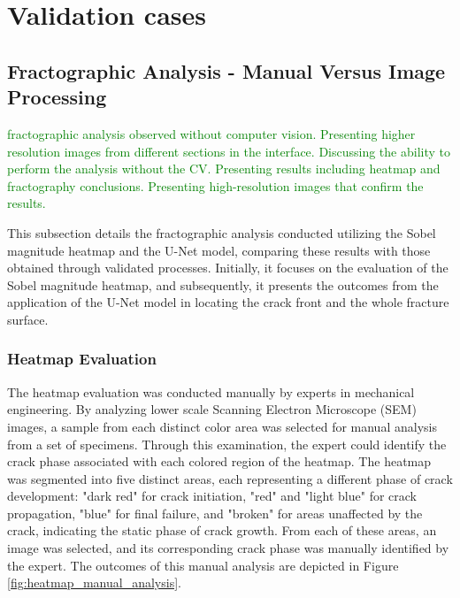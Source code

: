 \documentclass[preprint,12pt]{elsarticle}
\begin{document}
\section{Validation cases}
\label{Sec: Validation cases}

\subsection{Fractographic Analysis - Manual Versus Image Processing}
\label{Subsec: Experimental Results}
\textcolor{green}{fractographic analysis observed without computer vision. Presenting higher resolution images from different sections in the interface. Discussing the ability to perform the analysis without the CV. Presenting results including heatmap and fractography conclusions. Presenting high-resolution images that confirm the results.
}

This subsection details the fractographic analysis conducted utilizing the Sobel magnitude heatmap and the U-Net model, comparing these results with those obtained through validated processes.
Initially, it focuses on the evaluation of the Sobel magnitude heatmap, and subsequently, it presents the outcomes from the application of the U-Net model in locating the crack front and the whole fracture surface.

\subsubsection{Heatmap Evaluation}
\label{Subsubsec: Heatmap Evaluation}

The heatmap evaluation was conducted manually by experts in mechanical engineering.
By analyzing lower scale Scanning Electron Microscope (SEM) images, a sample from each distinct color area was selected for manual analysis from a set of specimens. Through this examination, the expert could identify the crack phase associated with each colored region of the heatmap.
The heatmap was segmented into five distinct areas, each representing a different phase of crack development: "dark red" for crack initiation, "red" and "light blue" for crack propagation, "blue" for final failure, and "broken" for areas unaffected by the crack, indicating the static phase of crack growth. From each of these areas, an image was selected, and its corresponding crack phase was manually identified by the expert. The outcomes of this manual analysis are depicted in Figure \ref{fig:heatmap_manual_analysis}.
\end{document}
